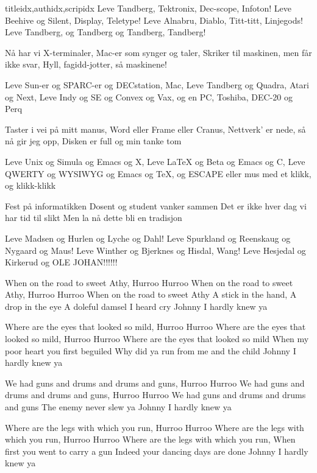 \documentclass[14pt,letterpaper,norsk]{article}
\begin{document}
\begin{songs}{titleidx,authidx,scripidx}
\beginchorus
Leve Tandberg, Tektronix, Dec-scope, Infoton!
Leve Beehive og Silent, Display, Teletype!
Leve Alnabru, Diablo, Titt-titt, Linjegods!
Leve Tandberg, og Tandberg og Tandberg, Tandberg!
\endchorus

\beginverse
Nå har vi X-terminaler,
Mac-er som synger og taler,
Skriker til maskinen, men får ikke svar,
Hyll, fagidd-jotter, så maskinene!
\endverse

\beginchorus
Leve Sun-er og SPARC-er og DECstation, Mac,
Leve Tandberg og Quadra, Atari og Next,
Leve Indy og SE og Convex og Vax,
og en PC, Toshiba, DEC-20 og Perq
\endchorus

\beginverse
Taster i vei på mitt manus,
Word eller Frame eller Cranus,
Nettverk' er nede, så nå gir jeg opp,
Disken er full og min tanke tom
\endverse

\beginchorus
Leve Unix og Simula og Emacs og X,
Leve \LaTeX{} og Beta og Emacs og C,
Leve QWERTY og WYSIWYG og Emacs og \TeX{},
og ESCAPE eller mus med et klikk, og klikk-klikk
\endchorus

\beginverse
Fest på informatikken
Dosent og student vanker sammen
Det er ikke hver dag vi har tid til slikt
Men la nå dette bli en tradisjon
\endverse

\beginchorus
Leve Madsen og Hurlen og Lyche og Dahl!
Leve Spurkland og Reenskaug og Nygaard og Maus!
Leve Winther og Bjerknes og Hisdal, Wang!
Leve Hesjedal og Kirkerud og OLE JOHAN!!!!!!
\endchorus
\endsong

\beginverse
When on the road to sweet Athy,
Hurroo Hurroo
When on the road to sweet Athy,
Hurroo Hurroo
When on the road to sweet Athy
A stick in the hand, A drop in the eye
A doleful damsel I heard cry
Johnny I hardly knew ya
\endverse

\beginverse
Where are the eyes that looked so mild,
Hurroo Hurroo
Where are the eyes that looked so mild,
Hurroo Hurroo
Where are the eyes that looked so mild
When my poor heart you first beguiled
Why did ya run from me and the child
Johnny I hardly knew ya
\endverse

\beginchorus
We had guns and drums and drums and guns,
Hurroo Hurroo
We had guns and drums and drums and guns,
Hurroo Hurroo
We had guns and drums and drums and guns
The enemy never slew ya
Johnny I hardly knew ya
\endchorus

\beginverse
Where are the legs with which you run,
Hurroo Hurroo
Where are the legs with which you run,
Hurroo Hurroo
Where are the legs with which you run,
When first you went to carry a gun
Indeed your dancing days are done
Johnny I hardly knew ya
\endverse


\end{songs}
\end{document}
